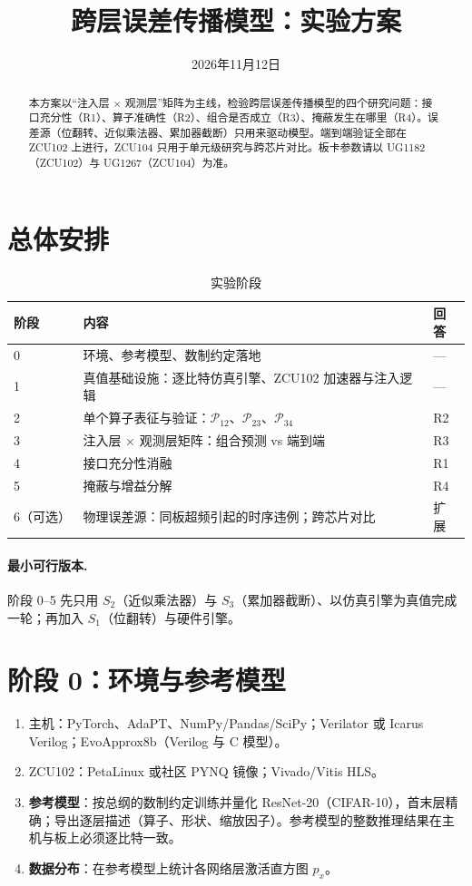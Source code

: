 \documentclass[11pt,a4paper]{ctexart}
\title{跨层误差传播模型：实验方案}
\date{2026年11月12日}
\begin{document}
\maketitle

\begin{abstract}
本方案以“注入层 $\times$ 观测层”矩阵为主线，检验跨层误差传播模型的四个研究问题：接口充分性（R1）、算子准确性（R2）、组合是否成立（R3）、掩蔽发生在哪里（R4）。误差源（位翻转、近似乘法器、累加器截断）只用来驱动模型。端到端验证全部在 ZCU102 上进行，ZCU104 只用于单元级研究与跨芯片对比。板卡参数请以 UG1182（ZCU102）与 UG1267（ZCU104）为准。
\end{abstract}

\section{总体安排}
\begin{table}[h]
\centering
\small
\begin{tabularx}{\textwidth}{@{}lXl@{}}
\toprule
阶段 & 内容 & 回答 \\
\midrule
0 & 环境、参考模型、数制约定落地 & — \\
1 & 真值基础设施：逐比特仿真引擎、ZCU102 加速器与注入逻辑 & — \\
2 & 单个算子表征与验证：$\mathcal P_{12}$、$\mathcal P_{23}$、$\mathcal P_{34}$ & R2 \\
3 & 注入层 $\times$ 观测层矩阵：组合预测 vs 端到端 & R3 \\
4 & 接口充分性消融 & R1 \\
5 & 掩蔽与增益分解 & R4 \\
6（可选） & 物理误差源：同板超频引起的时序违例；跨芯片对比 & 扩展 \\
\bottomrule
\end{tabularx}
\caption{实验阶段}
\end{table}

\paragraph{最小可行版本.} 阶段 0--5 先只用 $S_2$（近似乘法器）与 $S_3$（累加器截断）、以仿真引擎为真值完成一轮；再加入 $S_1$（位翻转）与硬件引擎。

\section{阶段 0：环境与参考模型}
\begin{enumerate}[leftmargin=*]
  \item 主机：PyTorch、AdaPT、NumPy/Pandas/SciPy；Verilator 或 Icarus Verilog；EvoApprox8b（Verilog 与 C 模型）。
  \item ZCU102：PetaLinux 或社区 PYNQ 镜像；Vivado/Vitis HLS。
  \item \textbf{参考模型}：按总纲的数制约定训练并量化 ResNet-20（CIFAR-10），首末层精确；导出逐层描述（算子、形状、缩放因子）。参考模型的整数推理结果在主机与板上必须逐比特一致。
  \item \textbf{数据分布}：在参考模型上统计各网络层激活直方图 $p_x$。
\end{enumerate}
\end{document}
